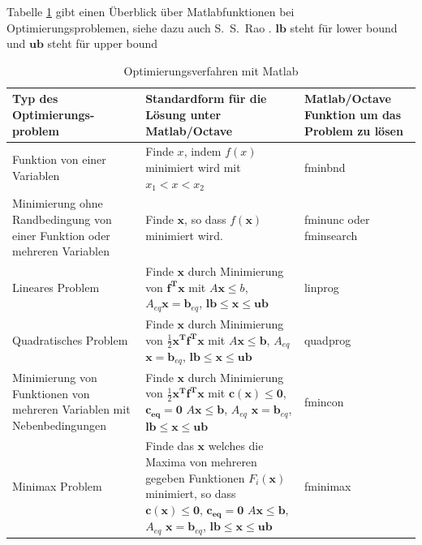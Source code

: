 \newpage
Tabelle \ref*{tab:Optimierungsverfahren} gibt einen Überblick über 
Matlabfunktionen bei Optimierungsproblemen, siehe dazu auch 
S.~S.~Rao \cite{Rao09}. $\mathbf{lb}$ steht für \glq lower bound\grq~ und $\mathbf{ub}$ steht für \glq upper bound\grq~

\begin{table}[!ht]
	\caption{Optimierungsverfahren mit Matlab}
	\centering
	\begin{tabular}{p{5cm} | >{\centering\arraybackslash} p{6cm} | p{4cm}}  \hline 
		Typ des Optimierungs- \newline problem &  Standardform für die Lösung unter Matlab/Octave &  Matlab/Octave Funktion um das Problem zu lösen \\[1ex]
		\hline \hline 
		Funktion von einer  \newline Variablen  & Finde $x$, indem $f(x)$ minimiert wird mit
		$x_1 < x < x_2$ & \textsf{fminbnd} \\[1ex] \hline 
		Minimierung ohne Randbedingung von einer Funktion oder mehreren Variablen &
		Finde $\mathbf x$, so dass $f(\mathbf x)$ minimiert wird.  & 
		\textsf{fminunc} oder \newline \textsf{fminsearch} \\[1ex] \hline 
		Lineares Problem & Finde $\mathbf x $ durch Minimierung von $\mathbf{f^T x}$ mit $A \mathbf x \le b$, $A_{eq} \mathbf x = \mathbf b_{eq}$, \newline
		$\mathbf{lb} \le \mathbf{x} \le \mathbf{ub}$ & \textsf{linprog} \\[1ex] \hline
		Quadratisches Problem & Finde $\mathbf x $ durch Minimierung von $\frac{1}{2} \mathbf{x^T}\mathbf{f^T x}$ mit $A \mathbf x \le \mathbf b$, 
		\newline $A_{eq}$ $\mathbf x = \mathbf b_{eq}$, \newline
		$\mathbf{lb} \le \mathbf{x} \le \mathbf{ub}$ & \textsf{quadprog} \\[1ex] \hline
		Minimierung von Funktionen von mehreren Variablen mit Nebenbedingungen &
		Finde $\mathbf x $ durch Minimierung von $\frac{1}{2} \mathbf{x^T}\mathbf{f^T x}$ mit $\mathbf{c(x) \le 0}$, 
		$\mathbf{c_{eq} = 0}$ \newline
		$A \mathbf x \le \mathbf b$, 
		$A_{eq}$ $\mathbf x = \mathbf b_{eq}$, \newline
		$\mathbf{lb} \le \mathbf x \le \mathbf{ub}$ & \textsf{fmincon} \\[1ex] \hline
		Minimax Problem & Finde das  $\mathbf x $ welches die Maxima
		von mehreren gegeben Funktionen $F_i(\mathbf x)$ minimiert, 
		so dass  $\mathbf{c(x) \le 0}$, 
		$\mathbf{c_{eq} = 0}$ \newline
		$A \mathbf x \le \mathbf b$, 
		$A_{eq}$ $\mathbf x = \mathbf b_{eq}$, \newline
		$\mathbf{lb} \le \mathbf x \le \mathbf{ub}$ & \textsf{fminimax} \\[1ex] \hline
	\end{tabular}
	\label{tab:Optimierungsverfahren}
\end{table}

